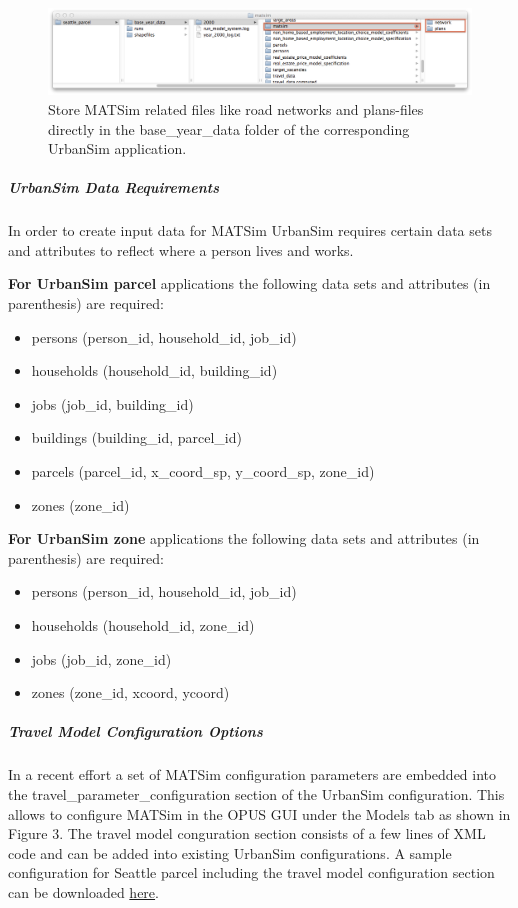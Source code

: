 \begin{figure}[htp]
\includegraphics[width=\textwidth]{figures/matsim4urbansim/seattle_parcel_base_year_dir_v2.png}
\caption{Store MATSim related files like road networks and  plans-files directly in the base\_year\_data folder of the corresponding  UrbanSim application.}
\end{figure}

\subparagraph{UrbanSim Data Requirements}

In order to create input data for MATSim UrbanSim requires certain  data sets and attributes to reflect where a person lives and works.

\textbf{For UrbanSim parcel} applications the following data sets and attributes (in parenthesis) are required:
\begin{itemize}
	\item persons (person\_id, household\_id, job\_id)
	\item households (household\_id, building\_id)
	\item jobs (job\_id, building\_id)
	\item buildings (building\_id, parcel\_id)
	\item parcels (parcel\_id, x\_coord\_sp, y\_coord\_sp, zone\_id)
	\item zones (zone\_id)
\end{itemize}

\textbf{For UrbanSim zone} applications the following data sets and attributes (in parenthesis) are required:
\begin{itemize}
	\item persons (person\_id, household\_id, job\_id)
	\item households (household\_id, zone\_id)
	\item jobs (job\_id, zone\_id)
	\item zones (zone\_id, xcoord, ycoord)
\end{itemize}

\subparagraph{Travel Model Configuration Options}

In a recent effort a set of MATSim configuration parameters are  embedded into the travel\_parameter\_configuration section of the UrbanSim  configuration. This allows to configure MATSim in the OPUS GUI under  the Models tab as shown in Figure 3. The travel model conguration  section consists of a few lines of XML code and can be added into  existing UrbanSim configurations. A sample configuration for Seattle  parcel including the travel model configuration section can be  downloaded \href{https://svn.vsp.tu-berlin.de/repos/public-svn/matsim/examples/countries/us/seattle/seattle_parcel.xml}{here}.

